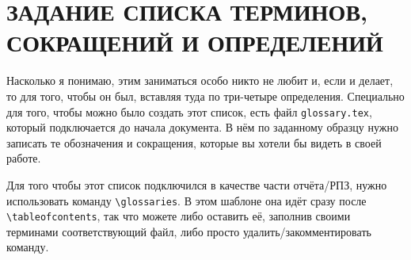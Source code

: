 \section{ЗАДАНИЕ СПИСКА ТЕРМИНОВ, СОКРАЩЕНИЙ И ОПРЕДЕЛЕНИЙ}

Насколько я понимаю, этим заниматься особо никто не любит и, если и делает, 
то для того, чтобы он был, вставляя туда по три-четыре определения. 
Специально для того, чтобы можно было создать этот список, есть файл 
\texttt{glossary.tex}, который подключается до начала документа. 
В нём по заданному образцу нужно записать те обозначения и сокращения, 
которые вы хотели бы видеть в своей работе. 

Для того чтобы этот список подключился в качестве части отчёта/РПЗ, 
нужно использовать команду \texttt{\textbackslash glossaries}. В этом 
шаблоне она идёт сразу после \texttt{\textbackslash tableofcontents}, так 
что можете либо оставить её, заполнив своими терминами соответствующий файл, 
либо просто удалить/закомментировать команду.
